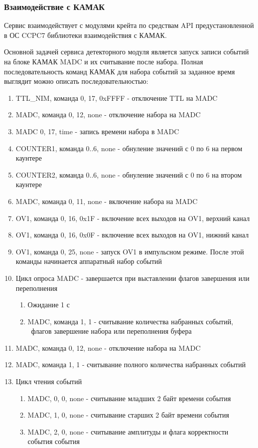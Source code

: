 \documentclass[a4paper,14pt]{extreport}
\begin{document}
\subsubsection{Взаимодействие с КАМАК}\label{camac-interaction}
Сервис взаимодействует с модулями крейта по средствам API предустановленной в ОС CCPC7 библиотеки взаимодействия с КАМАК.

Основной задачей сервиса детекторного модуля является запуск записи событий на блоке КАМАК MADC и их считывание после набора. Полная последовательность команд КАМАК для набора событий за заданное время выглядит можно описать последовательностью:

\begin{enumerate}
    \item TTL\_NIM, команда 0, 17, 0xFFFF - отключение TTL на MADC
    \item MADC, команда 0, 12, none - отключение набора на MADC
    \item MADC 0, 17, time - запись времени набора в MADC
    \item COUNTER1, команда 0..6, none - обнуление значений с 0 по 6 на первом каунтере
    \item COUNTER2, команда 0..6, none - обнуление значений с 0 по 6 на втором каунтере
    \item MADC, команда 0, 11, none - включение набора на MADC
    \item OV1, команда 0, 16, 0x1F - включение всех выходов на OV1, верхний канал
    \item OV1, команда 0, 16, 0x0F - включение всех выходов на OV1, нижний канал
    \item OV1, команда 0, 25, none - запуск OV1 в импульсном режиме. После этой команды начинается аппаратный набор событий
    \item Цикл опроса MADC - завершается при выставлении флагов завершения или переполнения
    \begin{enumerate}
        \item Ожидание 1 с
        \item MADC, команда 1, 1 - считывание количества набранных событий, \ флагов завершение набора или переполнения буфера
        \end{enumerate}
        \item MADC, команда 0, 12, none - отключение набора на MADC
        \item MADC, команда 1, 1 - считывание полного количества набранных событий
        \item Цикл чтения событий
        
        \begin{enumerate}
        \item MADC, 0, 0, none - считывание младших 2 байт времени события
        \item MADC, 1, 0, none - считывание старших 2 байт времени события
        \item MADC, 2, 0, none - считывание амплитуды и флага корректности события события
    \end{enumerate}
\end{enumerate}
\end{document}
